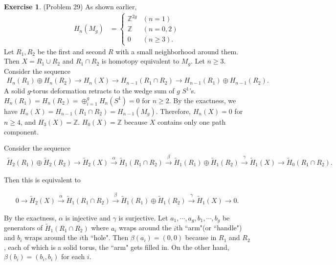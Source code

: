 \documentclass[psamsfonts]{amsart}
\theoremstyle{definition}
\newtheorem*{exer}{Exercise}
\theoremstyle{remark}
\numberwithin{equation}{section}
\begin{document}
\begin{exer}{(Problem 29)}
  As shown earlier,
  \begin{align*}
    H_n(M_g) &= \begin{cases}
      \mathbb{Z}^{2g} & (n = 1) \\
      \mathbb{Z} & (n = 0, 2) \\
      0 & (n \geq 3).
    \end{cases}
  \end{align*}
  Let $R_1, R_2$ be the first and second $R$ with a small neighborhood around them.
  Then $X = R_1 \cup R_2$ and $R_1 \cap R_2$ is homotopy equivalent to $M_g$.
  Let $n \geq 3$.
  Consider the sequence 
  \begin{align*}
    H_n(R_1) \oplus H_n(R_2) \rightarrow H_n(X) \rightarrow H_{n - 1}(R_1 \cap R_2) \rightarrow H_{n - 1}(R_1) \oplus H_{n - 1}(R_2).
  \end{align*}
  A solid $g$-torus deformation retracts to the wedge sum of $g$ $S^1$'s.
  $H_n(R_1) = H_n(R_2) = \oplus_{i=1}^g H_n(S^1) = 0$ for $n \geq 2$.
  By the exactness, we have $H_n(X) = H_{n - 1}(R_1 \cap R_2) = H_{n - 1}(M_g)$.
  Therefore, $H_n(X) = 0$ for $n \geq 4$, and $H_3(X) = \mathbb{Z}$.
  $H_0(X) = \mathbb{Z}$ because $X$ contains only one path component.

  Consider the sequence 
  \begin{align*}
    \tilde{H}_2(R_1) \oplus \tilde{H}_2(R_2) \rightarrow \tilde{H}_2(X) \xrightarrow{\alpha} \tilde{H}_{1}(R_1 \cap R_2) \xrightarrow{\beta} \tilde{H}_{1}(R_1) \oplus \tilde{H}_{1}(R_2) \xrightarrow{\gamma} \tilde{H}_1(X) \rightarrow \tilde{H}_0(R_1 \cap R_2).
  \end{align*}

  Then this is equivalent to

  \begin{align*}
    0 \rightarrow \tilde{H}_2(X) \xrightarrow{\alpha} \tilde{H}_{1}(R_1 \cap R_2) \xrightarrow{\beta} \tilde{H}_{1}(R_1) \oplus \tilde{H}_{1}(R_2) \xrightarrow{\gamma} \tilde{H}_1(X) \rightarrow 0.
  \end{align*}

  By the exactness, $\alpha$ is injective and $\gamma$ is surjective.
  Let $a_1, \cdots, a_g, b_1, \cdots, b_g$ be generators of $\tilde{H}_1(R_1 \cap R_2)$ where $a_i$ wraps around the $i$th ``arm"(or ``handle") and $b_i$ wraps around the $i$th ``hole".
  Then $\beta(a_i) = (0, 0)$ because in $R_1$ and $R_2$, each of which is a solid torus, the ``arm" gets filled in.
  On the other hand, $\beta(b_i) = (b_i, b_i)$ for each $i$.


\end{exer}
\end{document}
